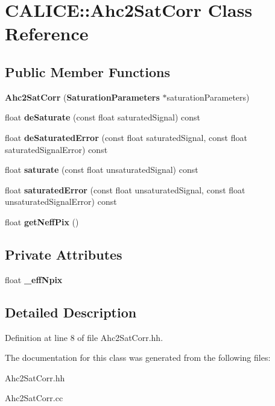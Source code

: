 \section{CALICE::Ahc2SatCorr Class Reference}
\label{classCALICE_1_1Ahc2SatCorr}
\subsection*{Public Member Functions}
\begin{DoxyCompactItemize}
\item 
{\bfseries Ahc2SatCorr} ({\bf SaturationParameters} $\ast$saturationParameters)\label{classCALICE_1_1Ahc2SatCorr_a552b6621c2f878725d70a1514cc50cc5}

\item 
float {\bfseries deSaturate} (const float saturatedSignal) const \label{classCALICE_1_1Ahc2SatCorr_ab6c572ce1b1ed8d4faa47911fea1443a}

\item 
float {\bfseries deSaturatedError} (const float saturatedSignal, const float saturatedSignalError) const \label{classCALICE_1_1Ahc2SatCorr_ae0ece65ff89cd1e35f841cf866f4a6db}

\item 
float {\bfseries saturate} (const float unsaturatedSignal) const \label{classCALICE_1_1Ahc2SatCorr_a4649f57514389e648d95f13925dc395d}

\item 
float {\bfseries saturatedError} (const float unsaturatedSignal, const float unsaturatedSignalError) const \label{classCALICE_1_1Ahc2SatCorr_ac099e86272cc99952a00afcf2c891e71}

\item 
float {\bfseries getNeffPix} ()\label{classCALICE_1_1Ahc2SatCorr_a713a0e340580379a17d4aeae3948cef8}

\end{DoxyCompactItemize}
\subsection*{Private Attributes}
\begin{DoxyCompactItemize}
\item 
float {\bfseries \_\-effNpix}\label{classCALICE_1_1Ahc2SatCorr_ac4a9b30dc0ce40a3125995cae2c293ae}

\end{DoxyCompactItemize}


\subsection{Detailed Description}


Definition at line 8 of file Ahc2SatCorr.hh.

The documentation for this class was generated from the following files:\begin{DoxyCompactItemize}
\item 
Ahc2SatCorr.hh\item 
Ahc2SatCorr.cc\end{DoxyCompactItemize}
